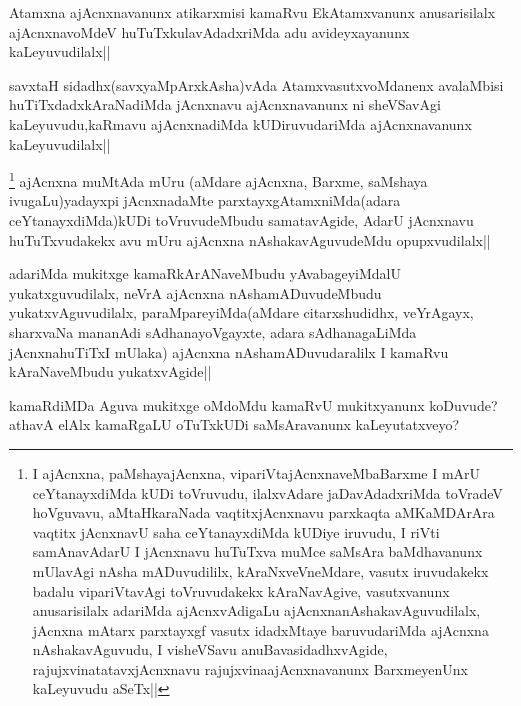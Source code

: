 \begin{artha}
Atamxna ajAcnxnavanunx atikarxmisi kamaRvu EkAtamxvanunx anusarisilalx ajAcnxnavoMdeV huTuTxkulavAdadxriMda adu avideyxayanunx kaLeyuvudilalx||
\end{artha}

\begin{artha}
savxtaH sidadhx(savxyaMpArxkAsha)vAda AtamxvasutxvoMdanenx avalaMbisi huTiTxdadxkAraNadiMda jAcnxnavu ajAcnxnavanunx ni sheVSavAgi kaLeyuvudu,kaRmavu ajAcnxnadiMda kUDiruvudariMda ajAcnxnavanunx kaLeyuvudilalx||
\end{artha}

\begin{artha}
\footnote{I ajAcnxna, paMshayajAcnxna, vipariVtajAcnxnaveMbaBarxme I mArU ceYtanayxdiMda kUDi toVruvudu, ilalxvAdare jaDavAdadxriMda toVradeV hoVguvavu, aMtaHkaraNada vaqtitxjAcnxnavu parxkaqta aMKaMDArAra vaqtitx jAcnxnavU saha ceYtanayxdiMda kUDiye iruvudu, I riVti samAnavAdarU I jAcnxnavu huTuTxva muMce saMsAra baMdhavanunx mUlavAgi nAsha mADuvudililx, kAraNxveVneMdare, vasutx iruvudakekx badalu vipariVtavAgi toVruvudakekx kAraNavAgive, vasutxvanunx anusarisilalx adariMda ajAcnxvAdigaLu ajAcnxnanAshakavAguvudilalx, jAcnxna  mAtarx parxtayxgf vasutx idadxMtaye baruvudariMda ajAcnxna nAshakavAguvudu, I visheVSavu anuBavasidadhxvAgide, rajujxvinatatavxjAcnxnavu rajujxvinaajAcnxnavanunx BarxmeyenUnx kaLeyuvudu aSeTx||} ajAcnxna muMtAda mUru (aMdare ajAcnxna, Barxme, saMshaya ivugaLu)yadayxpi jAcnxnadaMte parxtayxgAtamxniMda(adara ceYtanayxdiMda)kUDi toVruvudeMbudu samatavAgide, AdarU jAcnxnavu huTuTxvudakekx avu mUru ajAcnxna nAshakavAguvudeMdu opupxvudilalx||
\end{artha}

\begin{artha}
adariMda mukitxge kamaRkArANaveMbudu yAvabageyiMdalU yukatxguvudilalx, neVrA ajAcnxna nAshamADuvudeMbudu yukatxvAguvudilalx, paraMpareyiMda(aMdare citarxshudidhx, veYrAgayx, sharxvaNa mananAdi sAdhanayoVgayxte, adara sAdhanagaLiMda jAcnxnahuTiTxI mUlaka) ajAcnxna nAshamADuvudaralilx I kamaRvu kAraNaveMbudu yukatxvAgide||
\end{artha}


\begin{artha}
kamaRdiMDa Aguva mukitxge oMdoMdu kamaRvU mukitxyanunx koDuvude? athavA elAlx kamaRgaLU oTuTxkUDi saMsAravanunx kaLeyutatxveyo?
\end{artha}

